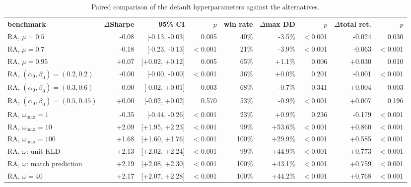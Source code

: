 \begin{table}[ht!]
\centering
\footnotesize
\setlength{\tabcolsep}{4pt}
\begin{tabular}{lrrrrrrrr}
\hline
benchmark & $\Delta$Sharpe & 95\% CI & $p$ & win rate & $\Delta$max DD & $p$ & $\Delta$total ret. & $p$ \\
\hline
RA, $\mu=0.5$ & -0.08 & [-0.13, -0.03] & 0.005 & 40\% & -3.5\% & $<$0.001 & -0.024 & 0.030 \\
RA, $\mu=0.7$ & -0.18 & [-0.23, -0.13] & $<$0.001 & 21\% & -3.9\% & $<$0.001 & -0.063 & $<$0.001 \\
RA, $\mu=0.95$ & +0.07 & [+0.02, +0.12] & 0.005 & 65\% & +1.1\% & 0.006 & +0.030 & 0.010 \\
RA, $(\alpha_0,\beta_0)=(0.2,0.2)$ & -0.00 & [-0.00, -0.00] & $<$0.001 & 36\% & +0.0\% & 0.201 & -0.001 & $<$0.001 \\
RA, $(\alpha_0,\beta_0)=(0.3,0.6)$ & -0.00 & [-0.02, +0.01] & 0.003 & 68\% & -0.7\% & 0.341 & +0.004 & 0.003 \\
RA, $(\alpha_0,\beta_0)=(0.5,0.45)$ & +0.00 & [-0.02, +0.02] & 0.570 & 53\% & -0.9\% & $<$0.001 & +0.007 & 0.196 \\
RA, $\omega_{\max}=1$ & -0.35 & [-0.44, -0.26] & $<$0.001 & 23\% & +0.9\% & 0.236 & -0.179 & $<$0.001 \\
RA, $\omega_{\max}=10$ & +2.09 & [+1.95, +2.23] & $<$0.001 & 99\% & +53.6\% & $<$0.001 & +0.860 & $<$0.001 \\
RA, $\omega_{\max}=100$ & +1.68 & [+1.60, +1.76] & $<$0.001 & 100\% & +29.9\% & $<$0.001 & +0.585 & $<$0.001 \\
RA, $\omega$: unit KLD & +2.13 & [+2.02, +2.24] & $<$0.001 & 99\% & +44.9\% & $<$0.001 & +0.773 & $<$0.001 \\
RA, $\omega$: match prediction & +2.19 & [+2.08, +2.30] & $<$0.001 & 100\% & +43.1\% & $<$0.001 & +0.759 & $<$0.001 \\
RA, $\omega=40$ & +2.17 & [+2.07, +2.28] & $<$0.001 & 100\% & +44.2\% & $<$0.001 & +0.768 & $<$0.001 \\
\hline
\end{tabular}
\caption{Paired comparison of the default hyperparameters against the alternatives.}
\label{tab:sensitivity_paired}
\end{table}
